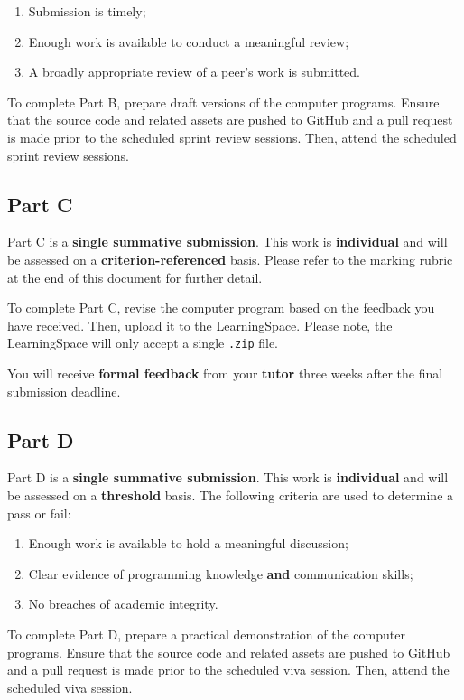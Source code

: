 \documentclass{../fal_assignment}
\begin{document}
\begin{enumerate}[label=(\alph*)]
	\item Submission is timely;
	\item Enough work is available to conduct a meaningful review;
	\item A broadly appropriate review of a peer's work is submitted.
\end{enumerate}

To complete Part B, prepare draft versions of the computer programs. Ensure that the source code and related assets are pushed to GitHub and a pull request is made prior to the scheduled sprint review sessions. Then, attend the scheduled sprint review sessions.

\subsection*{Part C}

Part C is a \textbf{single summative submission}. This work is \textbf{individual} and will be assessed on a \textbf{criterion-referenced} basis. Please refer to the marking rubric at the end of this document for further detail.

To complete Part C, revise the computer program based on the feedback you have received. Then, upload it to the LearningSpace. Please note, the LearningSpace will only accept a single \texttt{.zip} file.

You will receive \textbf{formal feedback} from your \textbf{tutor} three weeks after the final submission deadline.

\subsection*{Part D}

Part D is a \textbf{single summative submission}. This work is \textbf{individual} and will be assessed on a \textbf{threshold} basis.  The following criteria are used to determine a pass or fail:

\begin{enumerate}[label=(\alph*)]
	\item Enough work is available to hold a meaningful discussion;
	\item Clear evidence of programming knowledge \textbf{and} communication skills;
	\item No breaches of academic integrity.
\end{enumerate}

To complete Part D, prepare a practical demonstration of the computer programs. Ensure that the source code and related assets are pushed to GitHub and a pull request is made prior to the scheduled viva session. Then, attend the scheduled viva session.
\end{document}

